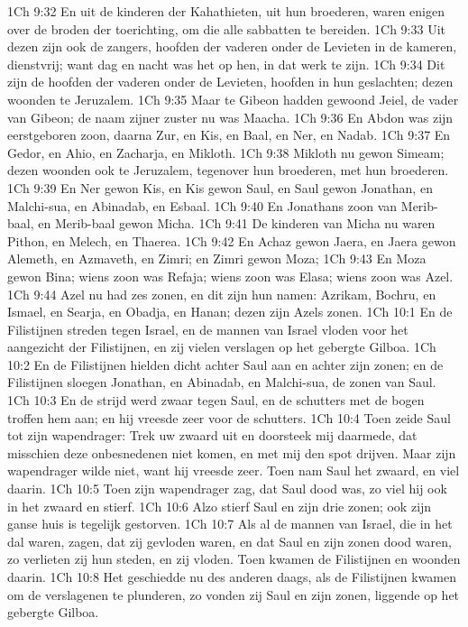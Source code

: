 1Ch 9:32  En uit de kinderen der Kahathieten, uit hun broederen, waren enigen over de broden der toerichting, om die alle sabbatten te bereiden.
1Ch 9:33  Uit dezen zijn ook de zangers, hoofden der vaderen onder de Levieten in de kameren, dienstvrij; want dag en nacht was het op hen, in dat werk te zijn.
1Ch 9:34  Dit zijn de hoofden der vaderen onder de Levieten, hoofden in hun geslachten; dezen woonden te Jeruzalem.
1Ch 9:35  Maar te Gibeon hadden gewoond Jeiel, de vader van Gibeon; de naam zijner zuster nu was Maacha.
1Ch 9:36  En Abdon was zijn eerstgeboren zoon, daarna Zur, en Kis, en Baal, en Ner, en Nadab.
1Ch 9:37  En Gedor, en Ahio, en Zacharja, en Mikloth.
1Ch 9:38  Mikloth nu gewon Simeam; dezen woonden ook te Jeruzalem, tegenover hun broederen, met hun broederen.
1Ch 9:39  En Ner gewon Kis, en Kis gewon Saul, en Saul gewon Jonathan, en Malchi-sua, en Abinadab, en Esbaal.
1Ch 9:40  En Jonathans zoon van Merib-baal, en Merib-baal gewon Micha.
1Ch 9:41  De kinderen van Micha nu waren Pithon, en Melech, en Thaerea.
1Ch 9:42  En Achaz gewon Jaera, en Jaera gewon Alemeth, en Azmaveth, en Zimri; en Zimri gewon Moza;
1Ch 9:43  En Moza gewon Bina; wiens zoon was Refaja; wiens zoon was Elasa; wiens zoon was Azel.
1Ch 9:44  Azel nu had zes zonen, en dit zijn hun namen: Azrikam, Bochru, en Ismael, en Searja, en Obadja, en Hanan; dezen zijn Azels zonen.
1Ch 10:1  En de Filistijnen streden tegen Israel, en de mannen van Israel vloden voor het aangezicht der Filistijnen, en zij vielen verslagen op het gebergte Gilboa.
1Ch 10:2  En de Filistijnen hielden dicht achter Saul aan en achter zijn zonen; en de Filistijnen sloegen Jonathan, en Abinadab, en Malchi-sua, de zonen van Saul.
1Ch 10:3  En de strijd werd zwaar tegen Saul, en de schutters met de bogen troffen hem aan; en hij vreesde zeer voor de schutters.
1Ch 10:4  Toen zeide Saul tot zijn wapendrager: Trek uw zwaard uit en doorsteek mij daarmede, dat misschien deze onbesnedenen niet komen, en met mij den spot drijven. Maar zijn wapendrager wilde niet, want hij vreesde zeer. Toen nam Saul het zwaard, en viel daarin.
1Ch 10:5  Toen zijn wapendrager zag, dat Saul dood was, zo viel hij ook in het zwaard en stierf.
1Ch 10:6  Alzo stierf Saul en zijn drie zonen; ook zijn ganse huis is tegelijk gestorven.
1Ch 10:7  Als al de mannen van Israel, die in het dal waren, zagen, dat zij gevloden waren, en dat Saul en zijn zonen dood waren, zo verlieten zij hun steden, en zij vloden. Toen kwamen de Filistijnen en woonden daarin.
1Ch 10:8  Het geschiedde nu des anderen daags, als de Filistijnen kwamen om de verslagenen te plunderen, zo vonden zij Saul en zijn zonen, liggende op het gebergte Gilboa.
